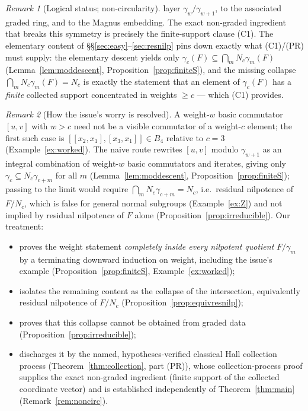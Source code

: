 \documentclass{amsart}
\theoremstyle{definition}
\theoremstyle{remark}
\newtheorem{remark}{Remark}
\begin{document}
\begin{remark}[Logical status; non-circularity]
layer $\gamma_w/\gamma_{w+1}$, to the associated graded ring, and to the Magnus
embedding. The exact non-graded ingredient that breaks this symmetry is precisely the
finite-support clause (C1). The elementary content of
\S\S\ref{sec:easy}--\ref{sec:resnilp} pins down exactly what (C1)/(PR) must supply: the
elementary descent yields only $\gamma_c(F)\subseteq\bigcap_m N_c\gamma_m(F)$
(Lemma~\ref{lem:moddescent}, Proposition~\ref{prop:finiteS}), and the missing collapse
$\bigcap_m N_c\gamma_m(F)=N_c$ is exactly the statement that an element of $\gamma_c(F)$
has a \emph{finite} collected support concentrated in weights $\ge c$ --- which (C1)
provides.
\end{remark}



\begin{remark}[How the issue's worry is resolved]\label{rem:issue}
A weight-$w$ basic commutator $[u,v]$ with $w>c$ need not be a visible commutator of a
weight-$c$ element; the first such case is $[[x_2,x_1],[x_3,x_1]]\in B_4$ relative to
$c=3$ (Example~\ref{ex:worked}). The naive route rewrites $[u,v]$ modulo
$\gamma_{w+1}$ as an integral combination of weight-$w$ basic commutators and
iterates, giving only $\gamma_c\subseteq N_c\gamma_{c+m}$ for all $m$
(Lemma~\ref{lem:moddescent}, Proposition~\ref{prop:finiteS}); passing to the limit
would require $\bigcap_m N_c\gamma_{c+m}=N_c$, i.e.\ residual nilpotence of $F/N_c$,
which is false for general normal subgroups (Example~\ref{ex:Z}) and not implied by
residual nilpotence of $F$ alone (Proposition~\ref{prop:irreducible}). Our treatment:
\begin{itemize}
\item proves the weight statement \emph{completely inside every nilpotent quotient}
$F/\gamma_m$ by a terminating downward induction on weight, including the issue's
example (Proposition~\ref{prop:finiteS}, Example~\ref{ex:worked});
\item isolates the remaining content as the collapse of the intersection,
equivalently residual nilpotence of $F/N_c$ (Proposition~\ref{prop:equivresnilp});
\item proves that this collapse cannot be obtained from graded data
(Proposition~\ref{prop:irreducible});
\item discharges it by the named, hypotheses-verified classical Hall collection process
(Theorem~\ref{thm:collection}, part (PR)), whose collection-process proof supplies the
exact non-graded ingredient (finite support of the collected coordinate vector) and is
established independently of Theorem~\ref{thm:main} (Remark~\ref{rem:noncirc}).
\end{itemize}
\end{remark}
\end{document}
